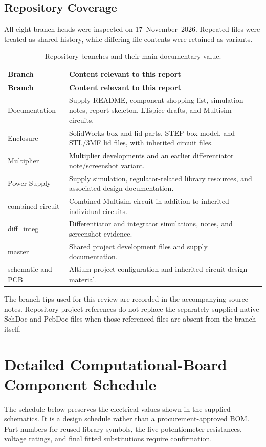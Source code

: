 \documentclass[11pt,a4paper]{article}
\begin{document}
\subsection{Repository Coverage}
All eight branch heads were inspected on 17~November~2026. Repeated files were treated as shared history, while differing file contents were retained as variants.
\begin{longtable}{P{0.25\textwidth}P{0.66\textwidth}}
\caption{Repository branches and their main documentary value.}\\
\toprule\textbf{Branch} & \textbf{Content relevant to this report}\\\midrule\endfirsthead
\toprule\textbf{Branch} & \textbf{Content relevant to this report}\\\midrule\endhead
Documentation & Supply README, component shopping list, simulation notes, report skeleton, LTspice drafts, and Multisim circuits.\\
Enclosure & SolidWorks box and lid parts, STEP box model, and STL/3MF lid files, with inherited circuit files.\\
Multiplier & Multiplier developments and an earlier differentiator note/screenshot variant.\\
Power-Supply & Supply simulation, regulator-related library resources, and associated design documentation.\\
combined-circuit & Combined Multisim circuit in addition to inherited individual circuits.\\
diff\_integ & Differentiator and integrator simulations, notes, and screenshot evidence.\\
master & Shared project development files and supply documentation.\\
schematic-and-PCB & Altium project configuration and inherited circuit-design material.\\
\bottomrule
\end{longtable}
The branch tips used for this review are recorded in the accompanying source notes. Repository project references do not replace the separately supplied native SchDoc and PcbDoc files when those referenced files are absent from the branch itself.

\section{Detailed Computational-Board Component Schedule}
\label{app:bom}
The schedule below preserves the electrical values shown in the supplied schematics. It is a design schedule rather than a procurement-approved BOM. Part numbers for reused library symbols, the five potentiometer resistances, voltage ratings, and final fitted substitutions require confirmation.
\end{document}
